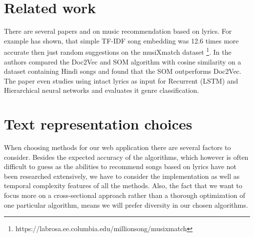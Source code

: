 
\section{Related work}\label{sec:text_related_work}

 There are several papers and on music recommendation based on lyrics. For example \cite{Gossi2016LyricBasedMR} has shown, that simple TF-IDF song embedding was 12.6 times more accurate then just random suggestions on the musiXmatch dataset \footnote{https://labrosa.ee.columbia.edu/millionsong/musixmatch}.  In \cite{inproceedings} the authors compared the Doc2Vec and SOM algorithm with cosine similarity on a dataset containing Hindi songs and found that the SOM outperforms Doc2Vec. The paper \cite{DBLP:journals/corr/Tsaptsinos17} even studies using intact lyrics as input for Recurrent (LSTM) and Hierarchical neural networks and evaluates it genre classification.

\section{Text representation choices}
When choosing methods for our web application there are several factors to consider. Besides the expected accuracy of the algorithms, which however is often difficult to guess as the abilities to recommend songs based on lyrics have not been researched extensively, we have to consider the implementation as well as temporal complexity features of all the methods. Also, the fact that we want to focus more on a cross-sectional approach rather than a thorough optimization of one particular algorithm, means we will prefer diversity in our chosen algorithms. \\

